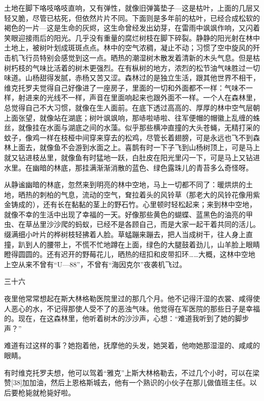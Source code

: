 土地在脚下咯吱咯吱直响，又有弹性，就像旧弹簧垫子—这是枯叶，上面的几层又轻又脆，尽管已枯死，但依然片片不同。下面则是多年前的枯叶，已经合成松软的褐色的一片—这是生命的灰烬，这生命曾经发出幼芽，在雷雨中飒飒作响，又闪着笑眼迎接雨后的阳光。几乎没有重量的腐烂树枝在脚下碎裂。静静的阳光射在林中土地上，被树叶划成斑斑点点。林中的空气浓稠，凝止不动；习惯了空中旋风的歼击机飞行员特别会感觉到这一点。晒热的潮湿树木散发着清新的木头气息。但是枯树朽枝的气味比活着的树木更强烈。在有枞树的地方，浓烈的松节油气味胜过一切味道。山杨甜得发腻，赤杨又苦又涩。森林过的是独立生活，跟其他世界不相干，维克托罗夫觉得自己好像进了一座房子，里面的一切和外面都不一样：气味不一样，射进来的光线不一样，声音在里面响起来也跟外面不一样。一个人在森林里，总觉得自己不大习惯，就像在生人面前。在底下透过高高的、厚厚的林中空气层朝上面张望，就像站在湖底；树叶飒飒响，那哧啦哧啦、往军便帽的帽徽上乱缠的蛛丝，就像挂在水面与湖底之间的水藻。似乎那些横冲直撞的大头苍蝇，无精打采的蚊子，像鸡一样在枝桠中间穿来穿去的松鸡，尽管长着翅膀，可是永远也飞不到森林上面去，就像鱼不会游到水面之上。喜鹊有时一下子飞到山杨树顶上，可是马上就又钻进枝丛里，就像鱼有时猛地一跃，白肚皮在阳光里闪一下，可是马上又钻进水里。在幽暗的林底，那挂满渐渐消散的蓝色、绿色露珠儿的青苔多么奇怪呀。

从静谧幽暗的林底，忽然来到明亮的林中空地，马上一切都不同了：暖烘烘的土地，晒热的刺柏的气息，流动的空气，耷拉着头的风铃草（那老大的风铃花像用紫金铸成的），还有长在黏黏的茎上的野石竹。心里顿时轻松起来；来到林中空地，就像不幸的生活中出现了幸福的一天。好像那些黄色的蝴蝶、蓝黑色的油亮的甲虫、在草丛里沙沙爬的蚂蚁，已经不是各顾自己，而是大家一起干着共同的活儿。缀满细小叶片的桦树枝轻拂着人脸。草蜢蹦来蹦去，把人当成树干，往人身上直撞，趴到人的腰带上，不慌不忙地蹲在上面，绿色的大腿鼓着劲儿，山羊脸上眼睛瞪得圆圆的。还有迟开的野莓花儿，晒热的纽扣和皮带扣环……大概，这林中空地上空从来不曾有“U—88”，不曾有“海因克尔”夜袭机飞过。

三十六

夜里他常常想起在斯大林格勒医院里过的那几个月。他不记得汗湿的衣裳、咸得使人恶心的水，不记得那使人受不了的恶浊气味。他觉得在军医院的那些日子是幸福的。现在，在这森林里，他听着树木的沙沙声，心想：“难道我听到了她的脚步声？”

难道有过这样的事？她抱着他，抚摩他的头发，她哭着，他吻她那湿湿的、咸咸的眼睛。

有时维克托罗夫想，他可以驾着“雅克”上斯大林格勒去，不过几个小时，可以在梁赞[38]加加油，然后上恩格斯城去，他有一个熟识的小伙子在那儿做值班主任。以后要枪毙就枪毙好啦。

